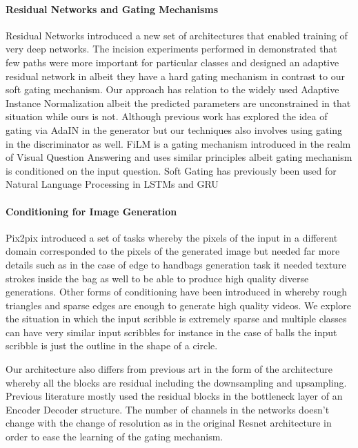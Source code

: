 \paragraph{Residual Networks and Gating Mechanisms} Residual Networks \cite{he2016deep} introduced a new set of architectures that enabled training of very deep networks. The incision experiments performed in \cite{veit2016residual} demonstrated that few paths were more important for particular classes and designed an adaptive residual network in \cite{veit2018adaptive} albeit they have a hard gating mechanism in contrast to our soft gating mechanism. Our approach has relation to the widely used Adaptive Instance Normalization albeit the predicted parameters are unconstrained in that situation while ours is not. Although previous work has explored the idea of gating via AdaIN in the generator but our techniques also involves using gating in the discriminator as well. FiLM \cite{perez2017film} is a gating mechanism introduced in the realm of Visual Question Answering and uses similar principles albeit gating mechanism is conditioned on the input question. Soft Gating has previously been used for Natural Language Processing in LSTMs \cite{hochreiter1997long} and GRU \cite{cho2014learning}

\paragraph{Conditioning for Image Generation}
Pix2pix \cite{isola2016image2image} introduced a set of tasks whereby the pixels of the input in a different domain corresponded to the pixels of the generated image but needed far more details such as in the case of edge to handbags generation task it needed texture strokes inside the bag as well to be able to produce high quality diverse generations. Other forms of conditioning have been introduced in \cite{wang2018video} whereby rough triangles and sparse edges are enough to generate high quality videos. We explore the situation in which the input scribble is extremely sparse and multiple classes can have very similar input scribbles for instance in the case of balls the input scribble is just the outline in the shape of a circle.

Our architecture also differs from previous art in the form of the architecture whereby all the blocks are residual including the downsampling and upsampling. Previous literature mostly used the residual blocks in the bottleneck layer of an Encoder Decoder structure. The number of channels in the networks doesn't change with the change of resolution as in the original Resnet architecture \cite{he2016deep} in order to ease the learning of the gating mechanism. 

